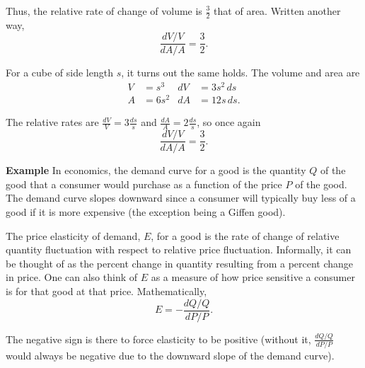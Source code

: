 \documentclass[twoside,openright,titlepage,a4paper]{book}
\begin{document}
\begin{sloppypar}
\begin{examplebox}
Thus, the relative rate of change of volume is $\frac{3}{2}$ that of area. Written another way, \[ \frac{dV/V}{dA/A} = \frac{3}{2}. \]

For a cube of side length $s$, it turns out the same holds. The volume and area are
\begin{align*}
V &= s^3 & dV &= 3s^2 \, ds \\
A &= 6 s^2 & dA &= 12 s \, ds. 
\end{align*}

The relative rates are $\frac{dV}{V} = 3 \frac{ds}{s}$ and $\frac{dA}{A} = 2 \frac{ds}{s}$, so once again \[ \frac{dV/V}{dA/A} = \frac{3}{2}. \]	
\end{examplebox}
\bigbreak
\textbf{Example} In economics, the demand curve for a good is the quantity $Q$ of the good that a consumer would purchase as a function of the price $P$ of the good. The demand curve slopes downward since a consumer will typically buy less of a good if it is more expensive (the exception being a Giffen good).

The price elasticity of demand, $E$, for a good is the rate of change of relative quantity fluctuation with respect to relative price fluctuation. Informally, it can be thought of as the percent change in quantity resulting from a percent change in price. One can also think of $E$ as a measure of how price sensitive a consumer is for that good at that price. Mathematically, \[ E = -\frac{dQ/Q}{dP/P}. \]

The negative sign is there to force elasticity to be positive (without it, $\frac{dQ/Q}{dP/P}$ would always be negative due to the downward slope of the demand curve).


\end{sloppypar}
\end{document}
